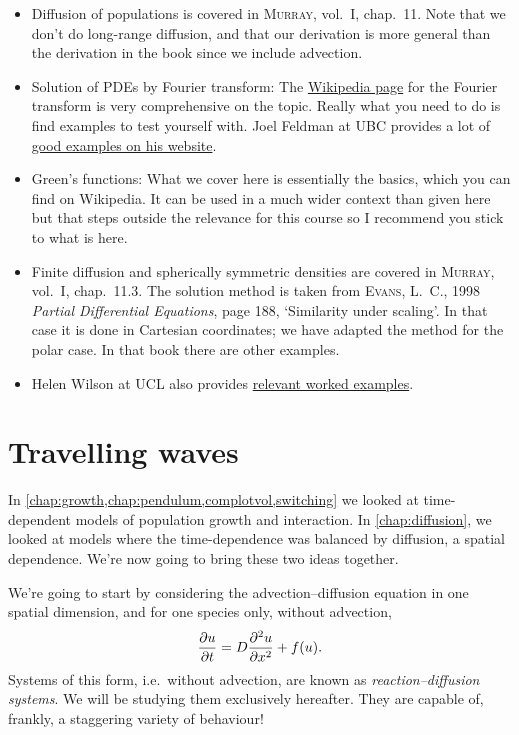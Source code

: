 \documentclass[main.tex]{subfiles}
\begin{document}
\begin{extra-reading}
\begin{itemize}
	\item Diffusion of populations is covered in \textsc{Murray}, vol.~I, chap.~11. Note that we don't do long-range diffusion, and that our derivation is more general than the derivation in the book since we include advection.
	\item Solution of PDEs by Fourier transform: The \href{https://en.wikipedia.org/wiki/Fourier_transform}{Wikipedia page} for the Fourier transform is very comprehensive on the topic. Really what you need to do is find examples to test yourself with. Joel Feldman at UBC provides a lot of \href{https://www.math.ubc.ca/~feldman/m267/pdeft.pdf}{good examples on his website}.
    \item Green's functions: What we cover here is essentially the basics, which you can find on Wikipedia. It can be used in a much wider context than given here but that steps outside the relevance for this course so I recommend you stick to what is here.
    \item Finite diffusion and spherically symmetric densities are covered in \textsc{Murray}, vol.~I, chap.~11.3. The solution method is taken from \textsc{Evans}, L.~C., 1998 \emph{Partial Differential Equations}, page 188, `Similarity under scaling'. In that case it is done in Cartesian coordinates; we have adapted the method for the polar case. In that book there are other examples.
    \item Helen Wilson at UCL also provides \href{https://www.homepages.ucl.ac.uk/~ucahhwi/LTCC/sectionB-similarity.pdf}{relevant worked examples}.
\end{itemize}
\end{extra-reading}

\chapter{Travelling waves}
\label{chap:travelling-waves}
\label{chap:pursuit-evasion}
In \cref{chap:growth,chap:pendulum,complotvol,switching} we looked at time-dependent models of population growth and interaction. In \cref{chap:diffusion}, we looked at models where the time-dependence was balanced by diffusion, a spatial dependence. We're now going to bring these two ideas together.

We're going to start by considering the advection--diffusion equation in one spatial dimension, and for one species only, without advection,
\begin{equation}
	\pd{u}{t} = D \pdd{u}{x} + f(u).
\end{equation}
Systems of this form, i.e.\ without advection, are known as \emph{reaction--diffusion systems}. We will be studying them exclusively hereafter. They are capable of, frankly, a staggering variety of behaviour!
\end{document}
